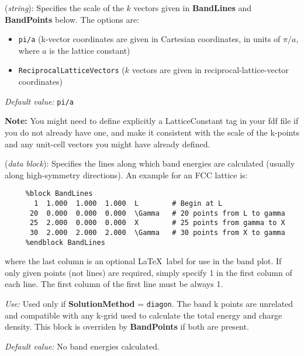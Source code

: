 \begin{description}

\itemsep 10pt
\parsep 0pt

\item[\textbf{BandLinesScale}] (\textit{string}):
Specifies the scale of the $k$ vectors given in \textbf{BandLines}
and \textbf{BandPoints} below.
The options are:
\begin{itemize}
\item \texttt{pi/a} (k-vector coordinates are given in Cartesian
coordinates, in units of $\pi/a$, where $a$ is the lattice constant)
\item \texttt{ReciprocalLatticeVectors} ($k$ vectors are given in
reciprocal-lattice-vector coordinates)
\end{itemize}

\textit{Default value:} \texttt{pi/a}

\textbf{Note:} You might need to define explicitly a LatticeConstant tag
in your fdf file if you do not already have one, and make it
consistent
with the scale of the k-points and any unit-cell vectors you might
have already defined.

\item[\textbf{BandLines}] (\textit{data block}):
Specifies the lines along which band energies are calculated
(usually along high-symmetry directions).
An example for an FCC lattice is:

\begin{verbatim}
     %block BandLines
       1  1.000  1.000  1.000  L        # Begin at L
      20  0.000  0.000  0.000  \Gamma   # 20 points from L to gamma
      25  2.000  0.000  0.000  X        # 25 points from gamma to X
      30  2.000  2.000  2.000  \Gamma   # 30 points from X to gamma
     %endblock BandLines
\end{verbatim}

where the last column is an optional \LaTeX\ label for use in the band plot.
If only given points (not lines) are required, simply specify 1 in the
first column of each line. The first column of the first line must be
always 1.

\textit{Use:} Used only if \textbf{SolutionMethod} = \texttt{diagon}.
The band k points are unrelated and compatible with any k-grid used
to calculate the total energy and charge density.
This block is overriden by \textbf{BandPoints} if both are present.

\textit{Default value:} No band energies calculated.


\end{description}
